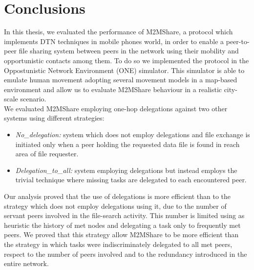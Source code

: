 
\chapter{Conclusions}\label{conclusioni} %





In this thesis, we evaluated the performance of M2MShare, a protocol which implements DTN techniques in mobile phones world, in order to enable a peer-to-peer file sharing system between peers in the network using their mobility and opportunistic contacts among them. To do so we implemented the protocol in the Oppostunistic Network Environment (ONE) simulator. This simulator is able to emulate human movement adopting several movement models in a map-based environment and allow us to evaluate M2MShare behaviour in a realistic city-scale scenario.
\\

We evaluated M2MShare employing one-hop delegations against two other systems using different strategies:
\begin{itemize}
\item \textit{No\_delegation:} system which does not employ delegations and file exchange is initiated only when a peer holding the requested data file is found in reach area of file requester.
\item \textit{Delegation\_to\_all:} system employing delegations but instead employs the trivial technique where missing tasks are delegated to each encountered peer.
\end{itemize}
Our analysis proved that the use of delegations is more efficient than to the strategy which does not employ delegations using it, due to the number of servant peers involved in the file-search activity. This number is limited using as heuristic the history of met nodes and delegating a task only to frequently met peers. We proved that this strategy allow M2MShare to be more efficient than the strategy in which tasks were indiscriminately delegated to all met peers, respect to the number of peers involved and to the redundancy introduced in the entire network.
\\


